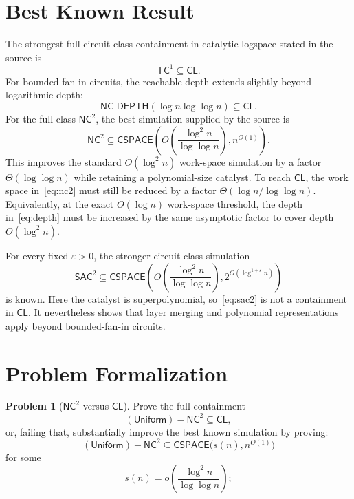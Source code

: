 \documentclass[10pt,a4paper]{article}
\theoremstyle{definition}
\newtheorem*{problem*}{Problem}
\newcommand{\CL}{\mathsf{CL}}
\newcommand{\NC}{\mathsf{NC}}
\newcommand{\TC}{\mathsf{TC}}
\newcommand{\SAC}{\mathsf{SAC}}
\newcommand{\CSPACE}{\mathsf{CSPACE}}
\begin{document}
\section{Best Known Result}

The strongest full circuit-class containment in catalytic logspace stated in
the source is
\begin{equation}
  \TC^1\subseteq\CL.
\end{equation}
For bounded-fan-in circuits, the reachable depth extends slightly beyond
logarithmic depth:
\begin{equation}\label{eq:depth}
  \mathsf{NC\mbox{-}DEPTH}(\log n\log\log n)
  \subseteq
  \CL.
\end{equation}
For the full class $\NC^2$, the best simulation supplied by the source is
\begin{equation}\label{eq:nc2}
  \NC^2
  \subseteq
  \CSPACE\left(
    O\left(\frac{\log^2n}{\log\log n}\right),
    n^{O(1)}
  \right).
\end{equation}
This improves the standard $O(\log^2n)$ work-space simulation by a factor
$\Theta(\log\log n)$ while retaining a polynomial-size catalyst. To reach
$\CL$, the work space in~\eqref{eq:nc2} must still be reduced by a factor
$\Theta(\log n/\log\log n)$. Equivalently, at the exact $O(\log n)$
work-space threshold, the depth in~\eqref{eq:depth} must be increased by the
same asymptotic factor to cover depth $O(\log^2n)$.

For every fixed $\varepsilon>0$, the stronger circuit-class simulation
\begin{equation}\label{eq:sac2}
  \SAC^2
  \subseteq
  \CSPACE\left(
    O\left(\frac{\log^2n}{\log\log n}\right),
    2^{O(\log^{1+\varepsilon}n)}
  \right)
\end{equation}
is known. Here the catalyst is superpolynomial, so~\eqref{eq:sac2} is not a
containment in $\CL$. It nevertheless shows that layer merging and polynomial
representations apply beyond bounded-fan-in circuits.

\section{Problem Formalization}

\begin{problem*}[$\NC^2$ versus $\CL$]
Prove the full containment
\begin{equation}
  (\mathsf{Uniform})-\NC^2\subseteq\CL,
\end{equation}
or, failing that, substantially improve the best known simulation by proving:
  \begin{equation}
    (\mathsf{Uniform})-\NC^2
    \subseteq
    \CSPACE\bigl(s(n),n^{O(1)}\bigr)
  \end{equation}
  for some
  \begin{equation}
    s(n)=o\left(\frac{\log^2n}{\log\log n}\right);
  \end{equation}


\end{problem*}
\end{document}

